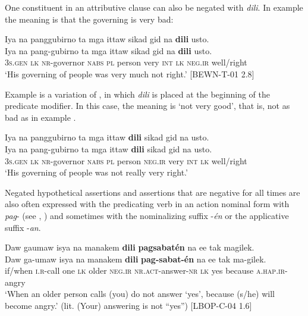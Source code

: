 One constituent in an attributive clause can also be negated with \textit{dili}. In example  the meaning is that the governing is very bad:

\ea
\label{bkm:Ref446664253}
Iya  na  panggubirno  ta  mga  ittaw  sikad  gid  na  \textbf{dili}  usto. \\\smallskip
\gll Iya  na  pang-gubirno  ta  mga  ittaw  sikad  gid  na  \textbf{dili}  usto. \\
3\textsc{s.gen}  \textsc{lk}  \textsc{nr-}governor  \textsc{nabs}  \textsc{pl}  person  very  \textsc{int}  \textsc{lk}  \textsc{neg.ir}  well/right \\
\glt ‘His governing of people was very much not right.’ [BEWN-T-01 2.8]
\z

Example  is a variation of , in which \textit{dili} is placed at the beginning of the predicate modifier. In this case, the meaning is ‘not very good’, that is, not as bad as in example .

\ea
\label{bkm:Ref373243525}
Iya  na  panggubirno  ta  mga  ittaw  \textbf{dili}  sikad  gid  na  usto. \\\smallskip
\gll Iya  na  pang-gubirno  ta  mga  ittaw  \textbf{dili}  sikad  gid  na  usto. \\
3\textsc{s.gen}  \textsc{lk}  \textsc{nr-}governor  \textsc{nabs}  \textsc{pl}  person  \textsc{neg.ir}  very  \textsc{int}  \textsc{lk}  well/right \\
\glt ‘His governing of people was not really very right.’
\z

Negated hypothetical assertions and assertions that are negative for all times are also often expressed with the predicating verb in an action nominal form with \textit{pag}{}- (see , ) and sometimes with the nominalizing suffix -\textit{én} or the applicative suffix -\textit{an}.

\ea
Daw  gaumaw  isya  na  manakem  \textbf{dili}  \textbf{pagsabatén}  na  ee tak  magilek. \\\smallskip
\gll Daw  ga-umaw  isya  na  manakem  \textbf{dili}  \textbf{pag-sabat-én}  na  ee tak  ma-gilek. \\
if/when  \textsc{i.r}-call  one  \textsc{lk}  older  \textsc{neg.ir}  \textsc{nr.act}-answer-\textsc{nr}  \textsc{lk}  yes
because  \textsc{a.hap.ir}-angry \\
\glt `When an older person calls (you) do not answer ‘yes’, because  (s/he) will become angry.’ (lit. (Your) answering is not “yes”) [LBOP-C-04 1.6]
\z


